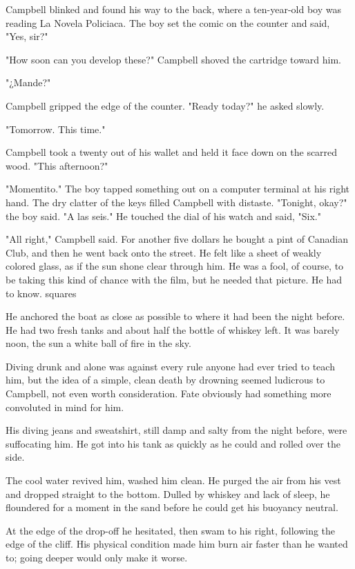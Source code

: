 Campbell blinked and found his way to the back, where a ten-year-old boy was reading La Novela Policiaca. The boy set the comic on the counter and said, "Yes, sir?"

"How soon can you develop these?" Campbell shoved the cartridge toward him.

"¿Mande?"

Campbell gripped the edge of the counter. "Ready today?" he asked slowly.

"Tomorrow. This time."

Campbell took a twenty out of his wallet and held it face down on the scarred wood. "This afternoon?"

"Momentito." The boy tapped something out on a computer terminal at his right hand. The dry clatter of the keys filled Campbell with distaste. "Tonight, okay?" the boy said. "A las seis." He touched the dial of his watch and said, "Six."

"All right," Campbell said. For another five dollars he bought a pint of Canadian Club, and then he went back onto the street. He felt like a sheet of weakly colored glass, as if the sun shone clear through him. He was a fool, of course, to be taking this kind of chance with the film, but he needed that picture. He had to know.
squares

He anchored the boat as close as possible to where it had been the night before. He had two fresh tanks and about half the bottle of whiskey left. It was barely noon, the sun a white ball of fire in the sky.

Diving drunk and alone was against every rule anyone had ever tried to teach him, but the idea of a simple, clean death by drowning seemed ludicrous to Campbell, not even worth consideration. Fate obviously had something more convoluted in mind for him.

His diving jeans and sweatshirt, still damp and salty from the night before, were suffocating him. He got into his tank as quickly as he could and rolled over the side.

The cool water revived him, washed him clean. He purged the air from his vest and dropped straight to the bottom. Dulled by whiskey and lack of sleep, he floundered for a moment in the sand before he could get his buoyancy neutral.

At the edge of the drop-off he hesitated, then swam to his right, following the edge of the cliff. His physical condition made him burn air faster than he wanted to; going deeper would only make it worse.

